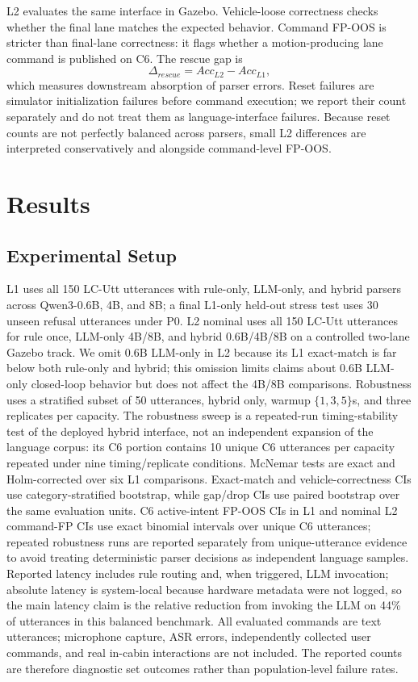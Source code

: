 \documentclass[conference]{IEEEtran}
\begin{document}
L2 evaluates the same interface in Gazebo. Vehicle-loose correctness checks whether the final lane matches the expected behavior. Command FP-OOS is stricter than final-lane correctness: it flags whether a motion-producing lane command is published on C6. The rescue gap is
\begin{equation}
\Delta_{rescue}=Acc_{L2}-Acc_{L1},
\end{equation}
which measures downstream absorption of parser errors. Reset failures are simulator initialization failures before command execution; we report their count separately and do not treat them as language-interface failures. Because reset counts are not perfectly balanced across parsers, small L2 differences are interpreted conservatively and alongside command-level FP-OOS.

\section{Results}
\subsection{Experimental Setup}
L1 uses all 150 LC-Utt utterances with rule-only, LLM-only, and hybrid parsers across Qwen3-0.6B, 4B, and 8B; a final L1-only held-out stress test uses 30 unseen refusal utterances under P0. L2 nominal uses all 150 LC-Utt utterances for rule once, LLM-only 4B/8B, and hybrid 0.6B/4B/8B on a controlled two-lane Gazebo track. We omit 0.6B LLM-only in L2 because its L1 exact-match is far below both rule-only and hybrid; this omission limits claims about 0.6B LLM-only closed-loop behavior but does not affect the 4B/8B comparisons. Robustness uses a stratified subset of 50 utterances, hybrid only, warmup $\{1,3,5\}$s, and three replicates per capacity. The robustness sweep is a repeated-run timing-stability test of the deployed hybrid interface, not an independent expansion of the language corpus: its C6 portion contains 10 unique C6 utterances per capacity repeated under nine timing/replicate conditions. McNemar tests are exact and Holm-corrected over six L1 comparisons. Exact-match and vehicle-correctness CIs use category-stratified bootstrap, while gap/drop CIs use paired bootstrap over the same evaluation units. C6 active-intent FP-OOS CIs in L1 and nominal L2 command-FP CIs use exact binomial intervals over unique C6 utterances; repeated robustness runs are reported separately from unique-utterance evidence to avoid treating deterministic parser decisions as independent language samples. Reported latency includes rule routing and, when triggered, LLM invocation; absolute latency is system-local because hardware metadata were not logged, so the main latency claim is the relative reduction from invoking the LLM on 44\% of utterances in this balanced benchmark. All evaluated commands are text utterances; microphone capture, ASR errors, independently collected user commands, and real in-cabin interactions are not included. The reported counts are therefore diagnostic set outcomes rather than population-level failure rates.
\end{document}
